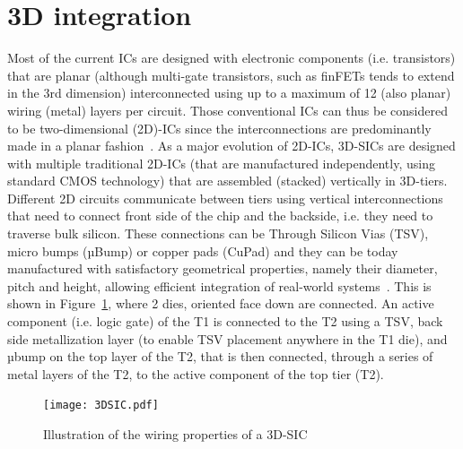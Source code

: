 \section{3D integration}

Most of the current ICs are designed with electronic components (i.e. transistors) that are planar (although multi-gate transistors, such as finFETs tends to extend in the 3rd dimension) interconnected using up to a maximum of 12 (also planar) wiring (metal) layers per circuit. Those conventional ICs can thus be considered to be two-dimensional (2D)-ICs since the interconnections are predominantly made in a planar fashion~\cite{1393404,fujitsu08}. As a major evolution of 2D-ICs, 3D-SICs are designed with multiple traditional 2D-ICs (that are manufactured independently, using standard CMOS technology) that are assembled (stacked) vertically in 3D-tiers. Different 2D circuits communicate between tiers using vertical interconnections that need to connect front side of the chip and the backside, i.e. they need to traverse bulk silicon. These connections can be Through Silicon Vias (TSV), micro bumps (µBump) or copper pads (CuPad) and they can be today manufactured with satisfactory geometrical properties, namely their diameter, pitch and height, allowing efficient integration of real-world systems~\cite{1705326,5746413}. This is shown in Figure~\ref{fig:3D_SIC_SOC2010}, where 2 dies, oriented face down are connected. An active component (i.e. logic gate) of the T1 is connected to the T2 using a TSV, back side metallization layer (to enable TSV placement anywhere in the T1 die), and µbump on the top layer of the T2, that is then connected, through a series of metal layers of the T2, to the active component of the top tier (T2).

\begin{figure}[h!]
\begin{center}
\texttt{[image: 3DSIC.pdf]}
\end{center}
\vspace{-0.5cm}
\caption{Illustration of the wiring properties of a 3D-SIC}
\label{fig:3D_SIC_SOC2010}
\end{figure}

